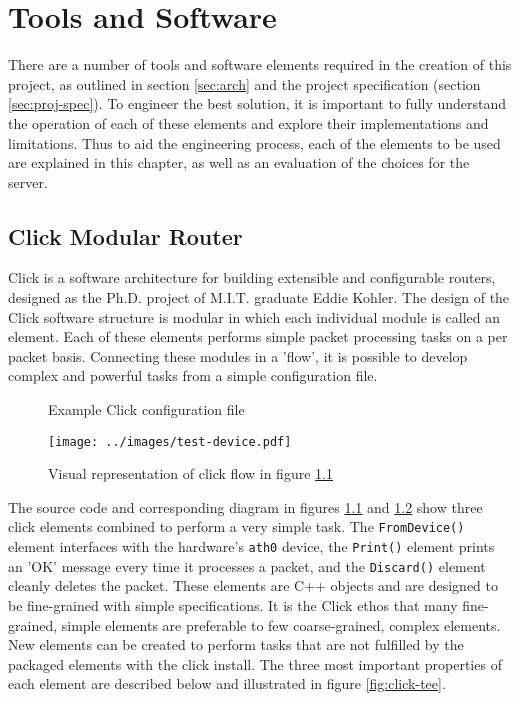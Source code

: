 \chapter{Tools and Software}

There are a number of tools and software elements required in the creation of this project, as outlined in section \ref{sec:arch} and the project specification (section \ref{sec:proj-spec}). To engineer the best solution, it is important to fully understand the operation of each of these elements and explore their implementations and limitations. Thus to aid the engineering process, each of the elements to be used are explained in this chapter, as well as an evaluation of the choices for the server.

  \section{Click Modular Router}
    \label{sec:click}
    Click is a software architecture for building extensible and configurable routers\cite{EKRM+00}, designed as the Ph.D. project of M.I.T. graduate Eddie Kohler. The design of the Click software structure is modular in which each individual module is called an element. Each of these elements performs simple packet processing tasks on a per packet basis. Connecting these modules in a 'flow', it is possible to develop complex and powerful tasks from a simple configuration file.

    \begin{figure}[H]
      \centering
      
      \caption{Example Click configuration file}
      \label{fig:click-file}
    \end{figure}
    \begin{figure}
      \centering
      \texttt{[image: ../images/test-device.pdf]}
      \caption{Visual representation of click flow in figure \ref{fig:click-file}}
      \label{fig:click-ex}
    \end{figure}

    The source code and corresponding diagram in figures \ref{fig:click-file} and \ref{fig:click-ex} show three click elements combined to perform a very simple task. The \texttt{FromDevice()} element interfaces with the hardware's \texttt{ath0} device, the \texttt{Print()} element prints an 'OK' message every time it processes a packet, and the \texttt{Discard()} element cleanly deletes the packet. These elements are C++ objects and are designed to be fine-grained with simple specifications. It is the Click ethos that many fine-grained, simple elements are preferable to few coarse-grained, complex elements. New elements can be created to perform tasks that are not fulfilled by the packaged elements with the click install. The three most important properties of each element are described below and illustrated in figure \ref{fig:click-tee}.\cite{EKRM+00}

